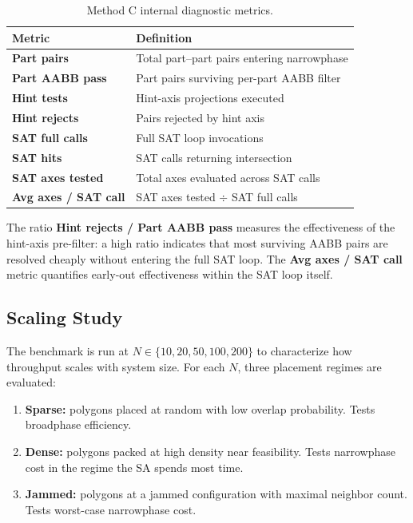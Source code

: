 \begin{table}[h]
\centering
\caption{Method C internal diagnostic metrics.}
\label{tab:bench-cached}
\begin{tabular}{ll}
\toprule
Metric & Definition \\
\midrule
\textbf{Part pairs} & Total part--part pairs entering narrowphase \\
\textbf{Part AABB pass} & Part pairs surviving per-part AABB filter \\
\textbf{Hint tests} & Hint-axis projections executed \\
\textbf{Hint rejects} & Pairs rejected by hint axis \\
\textbf{SAT full calls} & Full SAT loop invocations \\
\textbf{SAT hits} & SAT calls returning intersection \\
\textbf{SAT axes tested} & Total axes evaluated across SAT calls \\
\textbf{Avg axes / SAT call} & SAT axes tested $\div$ SAT full calls \\
\bottomrule
\end{tabular}
\end{table}

The ratio \textbf{Hint rejects / Part AABB pass} measures the
effectiveness of the hint-axis pre-filter: a high ratio indicates
that most surviving AABB pairs are resolved cheaply without
entering the full SAT loop.
The \textbf{Avg axes / SAT call} metric quantifies early-out
effectiveness within the SAT loop itself.

\subsection{Scaling Study}

The benchmark is run at $N \in \{10, 20, 50, 100, 200\}$ to characterize
how throughput scales with system size. For each $N$, three placement
regimes are evaluated:
\begin{enumerate}
  \item \textbf{Sparse:} polygons placed at random with low overlap
        probability. Tests broadphase efficiency.
  \item \textbf{Dense:} polygons packed at high density near feasibility.
        Tests narrowphase cost in the regime the SA spends most time.
  \item \textbf{Jammed:} polygons at a jammed configuration with maximal
        neighbor count. Tests worst-case narrowphase cost.
\end{enumerate}

